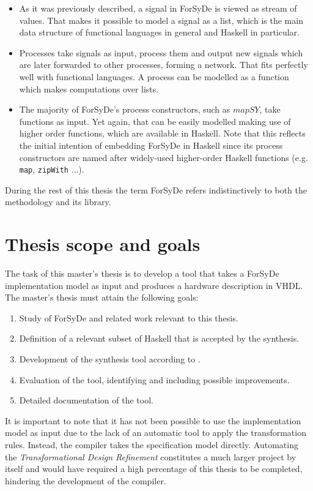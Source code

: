 \begin{itemize}

\item As it was previously described, a signal in ForSyDe is viewed as
  stream of values.  That makes it possible to model a signal as a list,
  which is the main data structure of functional languages in general
  and Haskell in particular.

\item Processes take signals as input, process them and output new
  signals which are later forwarded to other processes, forming a
  network. That fits perfectly well with functional languages.  A
  process can be modelled as a function which makes computations over
  lists.
  
\item The majority of ForSyDe's process constructors, such as
  $\mathit{mapSY}$, take functions as input. Yet again, that can be
  easily modelled making use of higher order functions, which are
  available in Haskell. Note that this reflects the initial intention
  of embedding ForSyDe in Haskell since its process constructors are
  named after widely-used higher-order Haskell functions (e.g.
  \texttt{map}, \texttt{zipWith} $\dots$).
\end{itemize}

During the rest of this thesis the term ForSyDe refers indistinctively
to both the methodology and its library.

\section{Thesis scope and goals}

The task of this master's thesis is to develop a tool that takes a ForSyDe
implementation model as input and produces a hardware description in VHDL.
The master's thesis must attain the following goals:

\begin{enumerate}[1)]
\item Study of ForSyDe and related work relevant to this thesis.
\item Definition of a relevant subset of Haskell that is accepted by
  the synthesis.
\item Development of the synthesis tool according to \cite{forsyde:thesis}.
\item Evaluation of the tool, identifying and including
  possible improvements.
\item Detailed documentation of the tool.
\end{enumerate}

It is important to note that it has not been possible to use the
implementation model as input due to the lack of an automatic tool to
apply the transformation rules. Instead, the compiler takes the
specification model directly. Automating the \textit{Transformational
  Design Refinement} constitutes a much larger project by itself and would have
required a high percentage of this thesis to be completed, hindering
the development of the compiler.
